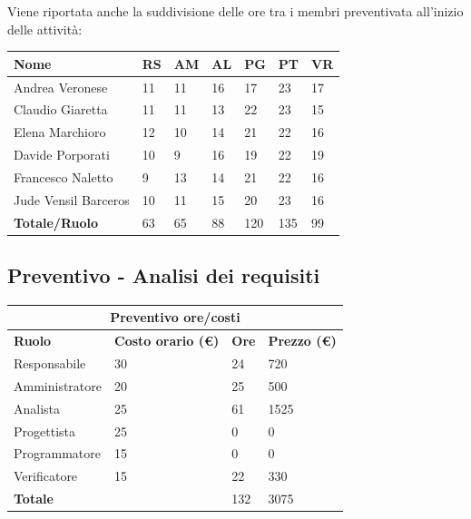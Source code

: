 \documentclass[9pt]{article}
\begin{document}
Viene riportata anche la suddivisione delle ore tra i membri preventivata all'inizio delle attività:
\begin{center}
	\begin{tabular}{|l|l|l|l|l|l|l|}
		\hline
		\textbf{Nome}         & \textbf{RS} & \textbf{AM} & \textbf{AL} & \textbf{PG} & \textbf{PT} & \textbf{VR} \\
		\hline
		Andrea Veronese       & 11          & 11          & 16          & 17          & 23          & 17          \\
		\hline
		Claudio Giaretta      & 11          & 11          & 13          & 22          & 23          & 15          \\
		\hline
		Elena Marchioro       & 12          & 10          & 14          & 21          & 22          & 16          \\
		\hline
		Davide Porporati      & 10          & 9           & 16          & 19          & 22          & 19          \\
		\hline
		Francesco Naletto     & 9           & 13          & 14          & 21          & 22          & 16          \\
		\hline
		Jude Vensil Barceros  & 10          & 11          & 15          & 20          & 23          & 16          \\
		\hline
		\textbf{Totale/Ruolo} & 63          & 65          & 88          & 120         & 135         & 99          \\
		\hline
	\end{tabular}
\end{center}

\subsection{Preventivo - Analisi dei requisiti}
\begin{center}
	\begin{tabularx}{\textwidth}{|X|X|X|X|}
		\hline
		\multicolumn{4}{|c|}{\textbf{Preventivo ore/costi}}                                      \\
		\hline
		\hline
		\textbf{Ruolo}  & \textbf{Costo orario (\euro)} & \textbf{Ore} & \textbf{Prezzo (\euro)} \\
		\hline									
		Responsabile    &	30		&	24		&	720		\\
		\hline									
		Amministratore  &	20		&	25		&	500		\\
		\hline									
		Analista        &	25		&	61		&	1525		\\
		\hline									
		Progettista     &	25		&	0		&	0		\\
		\hline									
		Programmatore   &	15		&	0		&	0		\\
		\hline									
		Verificatore    &	15		&	22		&	330		\\
		\hline									
		\textbf{Totale} &			&	132		&	3075		\\
		\hline																														
	\end{tabularx}\\[8pt]
	\mbox{}\\
\end{center}
\end{document}
